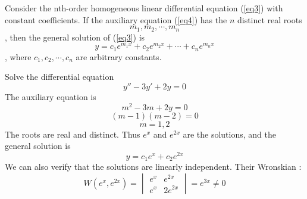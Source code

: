 \begin{theorem}{}{}
    Consider the nth-order homogeneous linear differential equation (\ref{eq3}) with constant coefficients. If the auxiliary equation (\ref{eq4}) has the $n$ distinct real roots \[
        m_1, m_2, \cdots, m_n
    \], then the general solution of (\ref{eq3}) is \[
        y = c_1e^{m_1x} + c_2e^{m_2x} + \cdots + c_ne^{m_nx}
    \], where $c_1, c_2, \cdots, c_n$ are arbitrary constants.
\end{theorem}

\begin{example}{
    Solve the differential equation \[
        y'' - 3y' + 2y = 0
\] }{}
    The auxiliary equation is \[
        m^2 - 3m + 2y = 0
    \]\[ (m-1)(m-2) = 0 \]
    \[ m = 1,2 \]
    The roots are real and distinct. Thus $e^{x}$ and $e^{2x}$ are the solutions, and the general solution is \[
        y = c_1e^{x} + c_2e^{2x}
    \]
    We can also verify that the solutions are linearly independent. Their Wronskian : \[
        W(e^{x}, e^{2x}) =
        \begin{vmatrix}
            e^{x} & e^{2x} \\
            e^{x} & 2e^{2x}
        \end{vmatrix} = e^{3x} \neq 0
    \]
\end{example}
























